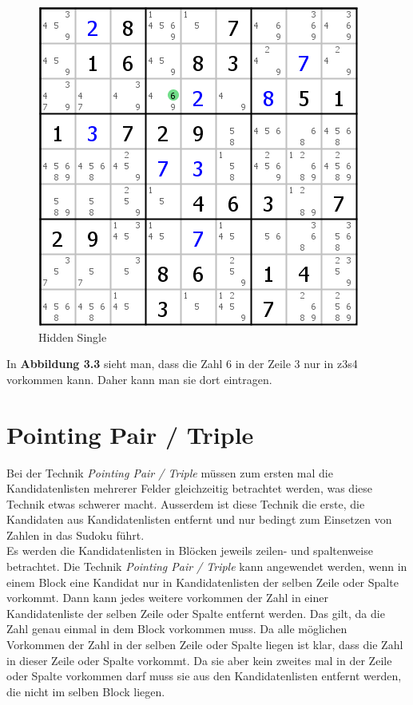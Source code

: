 \documentclass[accentcolor=tud6b,11pt,paper=a4]{tudreport}
\begin{document}
\begin{figure}[h]
\begin{center}
\includegraphics{./img/hidden_single.png}
\caption{Hidden Single}
\end{center}
\end{figure}

In \textbf{Abbildung 3.3} sieht man, dass die Zahl 6 in der Zeile 3 nur in z3s4 vorkommen kann. Daher kann man sie dort eintragen.

\newpage
\section{Pointing Pair / Triple}
Bei der Technik \textit{Pointing Pair / Triple} müssen zum ersten mal die Kandidatenlisten mehrerer Felder gleichzeitig betrachtet werden, was diese Technik etwas schwerer macht. Ausserdem ist diese Technik die erste, die Kandidaten aus Kandidatenlisten entfernt und nur bedingt zum Einsetzen von Zahlen in das Sudoku führt.\\
Es werden die Kandidatenlisten in Blöcken jeweils zeilen- und spaltenweise betrachtet. Die Technik \textit{Pointing Pair / Triple}
kann angewendet werden, wenn in einem Block eine Kandidat nur in Kandidatenlisten der selben Zeile oder Spalte vorkommt. Dann kann jedes weitere vorkommen der Zahl in einer Kandidatenliste der selben Zeile oder Spalte entfernt werden. Das gilt, da die Zahl genau einmal in dem Block vorkommen muss. Da alle möglichen Vorkommen der Zahl in der selben Zeile oder Spalte liegen ist klar, dass die Zahl in dieser Zeile oder Spalte vorkommt. Da sie aber kein zweites mal in der Zeile oder Spalte vorkommen darf muss sie aus den Kandidatenlisten entfernt werden, die nicht im selben Block liegen.
\end{document}
